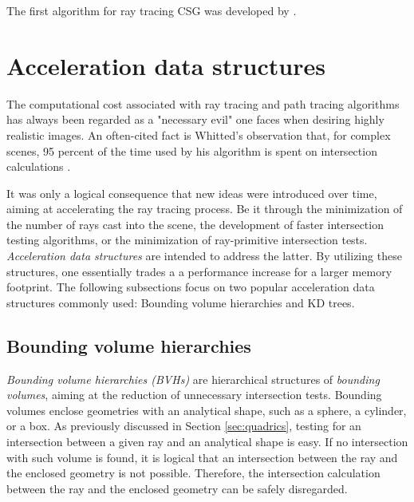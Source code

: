 The first algorithm for ray tracing CSG was developed by \cite{roth1982ray}. 


\section{Acceleration data structures} \label{sec:acceleration}
The computational cost associated with ray tracing and path tracing algorithms has always been regarded as a "necessary evil" one faces when desiring highly realistic images. An often-cited fact is Whitted's observation that, for complex scenes, 95 percent of the time used by his algorithm is spent on intersection calculations \cite[p 349]{whitted1979improved}.

It was only a logical consequence that new ideas were introduced over time, aiming at accelerating the ray tracing process. Be it through the minimization of the number of rays cast into the scene, the development of faster intersection testing algorithms, or the minimization of ray-primitive intersection tests. \emph{Acceleration data structures} are intended to address the latter. By utilizing these structures, one essentially trades a a performance increase for a larger memory footprint. The following subsections focus on two popular acceleration data structures commonly used: Bounding volume hierarchies and KD trees.

\subsection{Bounding volume hierarchies}

\emph{Bounding volume hierarchies (BVHs)} are hierarchical structures of \emph{bounding volumes}, aiming at the reduction of unnecessary intersection tests. Bounding volumes enclose geometries with an analytical shape, such as a sphere, a cylinder, or a box. As previously discussed in Section \ref{sec:quadrics}, testing for an intersection between a given ray and an analytical shape is easy. If no intersection with such volume is found, it is logical that an intersection between the ray and the enclosed geometry is not possible. Therefore, the intersection calculation between the ray and the enclosed geometry can be safely disregarded. 

